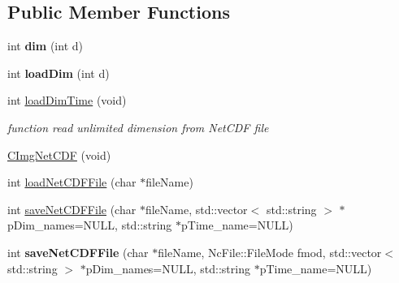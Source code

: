 \subsection*{Public Member Functions}
\begin{DoxyCompactItemize}
\item 
\hypertarget{classCImgNetCDF_abfd9f3decfff0f38b656de221bcf0114}{
int {\bfseries dim} (int d)}
\label{classCImgNetCDF_abfd9f3decfff0f38b656de221bcf0114}

\item 
\hypertarget{classCImgNetCDF_a8d8a73a128243c345fc19ce63c2d1b45}{
int {\bfseries loadDim} (int d)}
\label{classCImgNetCDF_a8d8a73a128243c345fc19ce63c2d1b45}

\item 
int \hyperlink{classCImgNetCDF_a2ad26dcd306b26255c307e4f6d881240}{loadDimTime} (void)
\begin{DoxyCompactList}\small\item\em function read unlimited dimension from NetCDF file \item\end{DoxyCompactList}\item 
\hyperlink{classCImgNetCDF_ac067a8f473f246cd11de6b7320a98631}{CImgNetCDF} (void)
\item 
int \hyperlink{classCImgNetCDF_ae7d505dcbd88ede3b6a1c771ce8a6be7}{loadNetCDFFile} (char $\ast$fileName)
\item 
int \hyperlink{classCImgNetCDF_a94e05ac95caf702c89b9d9344836d425}{saveNetCDFFile} (char $\ast$fileName, std::vector$<$ std::string $>$ $\ast$pDim\_\-names=NULL, std::string $\ast$pTime\_\-name=NULL)
\item 
\hypertarget{classCImgNetCDF_ac71ad9414c16aab2dec51065b756c661}{
int {\bfseries saveNetCDFFile} (char $\ast$fileName, NcFile::FileMode fmod, std::vector$<$ std::string $>$ $\ast$pDim\_\-names=NULL, std::string $\ast$pTime\_\-name=NULL)}
\label{classCImgNetCDF_ac71ad9414c16aab2dec51065b756c661}


\end{DoxyCompactItemize}

